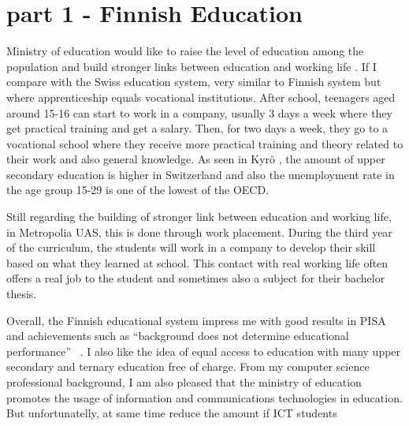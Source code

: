 \section{part 1 - Finnish Education}

Ministry of education would like to raise the level of  education among the population \cite[pp.9-10]{edu_2012} and build stronger links between education and working life \cite[pp.13-18]{edu_2012}.	
If I compare with the Swiss education system, very similar to Finnish system but where apprenticeship equals vocational institutions.
After school, teenagers aged around 15-16 can start to work in a company, usually 3 days a week where they get practical training and get a salary.
Then, for two days a week, they go to a vocational school where they receive more practical training and theory related to their work and also general knowledge.
As seen in Kyrö \cite[pp. 3-5]{kyro_2012}, the amount of upper secondary education is higher in Switzerland and also the unemployment rate in the age group 15-29 is one of the lowest of the OECD.

Still regarding the building of stronger link between education and working life, in Metropolia UAS, this is done through work placement.  
During the third year of the curriculum, the students will work in a company to develop their skill based on what they learned at school. 
This contact with real working life often offers a real job to the student and sometimes also a subject for their bachelor thesis.

Overall, the Finnish educational system impress me with good results in PISA and achievements such as ``background does not determine educational performance'' ~\cite[p.14]{kyro_2012}. 
I also like the idea of equal access to education with many upper secondary and ternary education free of charge.
From my computer science professional background, I am also pleased that the ministry of education \cite[p.18,48]{edu_2012} promotes the usage of information and communications technologies in education.
But unfortunatelly, at same time reduce the amount if ICT students \cite[Appendix 1]{edu_2012}